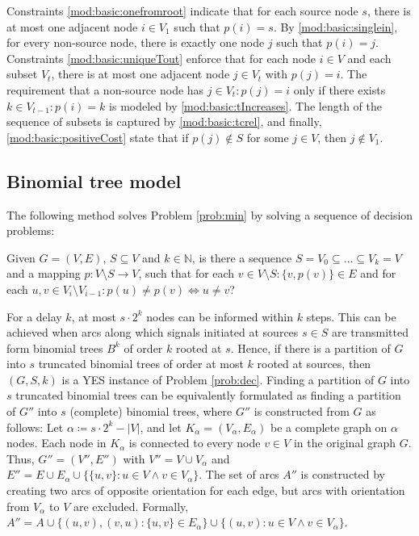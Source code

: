 Constraints \eqref{mod:basic:onefromroot} indicate that for each source node $s$, there is at most one adjacent node $i\in V_1$ such that $p(i)=s$.
By \eqref{mod:basic:singlein}, for every non-source node, there is exactly one node $j$ such that $p(i)=j$.
Constraints \eqref{mod:basic:uniqueTout} enforce that for each node $i\in V$ and each subset $V_t$, there is at most one adjacent node $j\in V_t$ with $p(j)=i$.
The requirement that a non-source node has $j\in V_t:p(j)=i$ only if there exists $k\in V_{t-1}: p(i)=k$ is modeled by \eqref{mod:basic:tIncreases}. 
The length of the sequence of subsets is captured by \eqref{mod:basic:tcrel}, and finally, \eqref{mod:basic:positiveCost} state that if $p(j)\not\in S$ for some $j\in V$, then $j\not\in V_1$.
\subsection{Binomial tree model}

The following method solves Problem \ref{prob:min} by solving a sequence of decision problems:
\begin{problem}
\label{prob:dec}
Given $G=(V,E)$, $S\subseteq V$ and $k\in \mathbb{N}$, is there a sequence $S=V_0\subseteq\dots\subseteq V_k=V$ 
and a mapping $p:V\setminus S\to V$, such that for each $v\in V\setminus S:\{v,p(v)\}\in E$ and for each  $u,v\in V_i\setminus V_{i-1}: p(u)\neq p(v)\Leftrightarrow u\neq v$?
\end{problem}
For a delay $k$, at most $s\cdot 2^k$ nodes can be informed within $k$ steps. 
This can be achieved when arcs along which signals initiated at sources $s\in S$ are transmitted form binomial trees $B^k$ of order $k$ rooted at $s$.
Hence, if there is a partition of $G$ into $s$ truncated binomial trees of order at most $k$ rooted at sources, then $(G,S,k)$ is a YES instance of Problem \ref{prob:dec}.
Finding a partition of $G$ into $s$ truncated binomial trees can be equivalently formulated as finding a partition of $G''$ into $s$ (complete) binomial trees, 
where $G''$ is constructed from $G$ as follows:
Let $\alpha\coloneqq s\cdot 2^k-|V|$, and let $K_\alpha=(V_\alpha,E_\alpha)$ be a complete graph on $\alpha$ nodes.
Each node in $K_\alpha$ is connected to every node $v\in V$ in the original graph $G$.
Thus, $G''=(V'',E'')$ with $V''=V\cup V_\alpha$ and $E''=E\cup E_\alpha\cup \{\{u,v\}: u\in V \wedge v\in V_\alpha\}$.
The set of arcs $A''$ is constructed by creating two arcs of opposite orientation for each edge, but arcs with orientation from $V_\alpha$ to $V$ are excluded. 
Formally, $A''=A\cup\{(u,v),(v,u): \{u,v\}\in E_\alpha\}\cup\{(u,v):u\in V \wedge v\in V_\alpha\}$.


